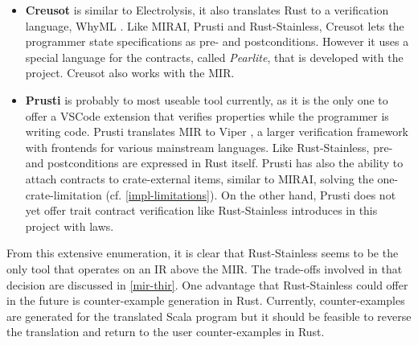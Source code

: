 \begin{itemize}
\item \textbf{Creusot} \cite{creusot} is similar to Electrolysis, it also
translates Rust to a verification language, WhyML \cite{why3}. Like MIRAI,
Prusti and Rust-Stainless, Creusot lets  the programmer state specifications as
pre- and postconditions. However it uses a special language for the contracts,
called \emph{Pearlite}, that is developed with the project. Creusot also works
with the MIR.

\item \textbf{Prusti} \cite{prusti} is probably to most useable tool currently,
as it is the only one  to offer a VSCode extension that verifies properties
while the programmer is writing code. Prusti translates MIR to Viper
\cite{viper}, a larger verification framework with frontends for various
mainstream languages. Like Rust-Stainless, pre- and postconditions are expressed
in Rust itself. Prusti has also the ability to attach contracts to
crate-external items, similar to MIRAI, solving the one-crate-limitation (cf.
\autoref{impl-limitations}). On the other hand, Prusti does not yet offer trait
contract verification like Rust-Stainless introduces in this project with laws.

\end{itemize}

From this extensive enumeration, it is clear that Rust-Stainless seems to be the
only tool that operates on an IR above the MIR. The trade-offs involved in that
decision are discussed in \autoref{mir-thir}. One advantage that Rust-Stainless
could offer in the future is counter-example generation in Rust. Currently,
counter-examples are generated for the translated Scala program but it should be
feasible to reverse the translation and return to the user counter-examples in
Rust.
